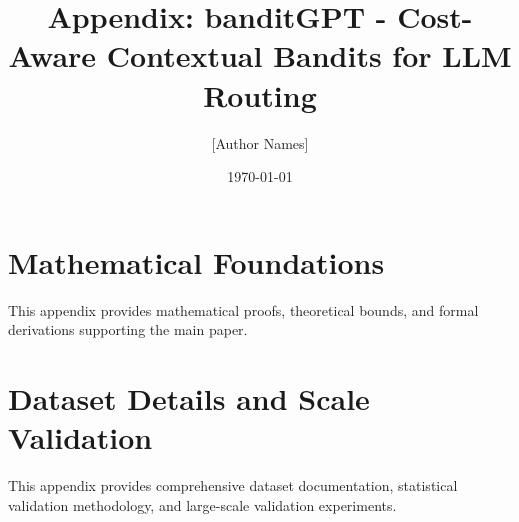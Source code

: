 \documentclass[10pt,letterpaper]{article}
\title{Appendix: banditGPT - Cost-Aware Contextual Bandits for LLM Routing}
\author{[Author Names]}
\date{\today}
\begin{document}
\ifx\appendixstandalone\undefined
\else
  \maketitle
  \tableofcontents
  \newpage
\fi


\appendix
\section{Mathematical Foundations}
\label{appendix:mathematical_foundations}

This appendix provides mathematical proofs, theoretical bounds, and formal derivations supporting the main paper.




\section{Dataset Details and Scale Validation}
\label{appendix:dataset_details}

This appendix provides comprehensive dataset documentation, statistical validation methodology, and large-scale validation experiments.

% 



% 

\end{document}

